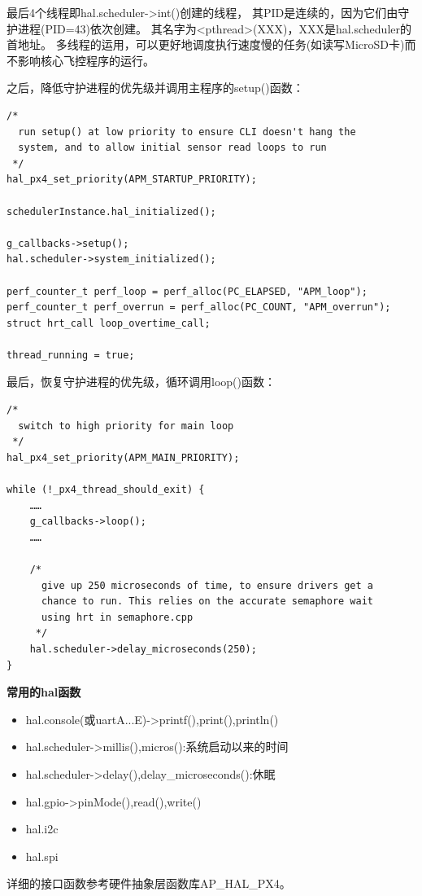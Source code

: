 \documentclass[a4paper,10pt]{ctexart} %
\begin{document}
\noindent 最后4个线程即hal.scheduler->int()创建的线程，
其PID是连续的，因为它们由守护进程(PID=43)依次创建。
其名字为<pthread>(XXX)，XXX是hal.scheduler的首地址。
多线程的运用，可以更好地调度执行速度慢的任务(如读写MicroSD卡)而不影响核心飞控程序的运行。

\noindent 之后，降低守护进程的优先级并调用主程序的setup()函数：
\begin{lstlisting}
/*
  run setup() at low priority to ensure CLI doesn't hang the
  system, and to allow initial sensor read loops to run
 */
hal_px4_set_priority(APM_STARTUP_PRIORITY);

schedulerInstance.hal_initialized();

g_callbacks->setup();
hal.scheduler->system_initialized();

perf_counter_t perf_loop = perf_alloc(PC_ELAPSED, "APM_loop");
perf_counter_t perf_overrun = perf_alloc(PC_COUNT, "APM_overrun");
struct hrt_call loop_overtime_call;

thread_running = true;
\end{lstlisting}
最后，恢复守护进程的优先级，循环调用loop()函数：
\begin{lstlisting}
/*
  switch to high priority for main loop
 */
hal_px4_set_priority(APM_MAIN_PRIORITY);

while (!_px4_thread_should_exit) {
	……
    g_callbacks->loop();
	……
	
    /*
      give up 250 microseconds of time, to ensure drivers get a
      chance to run. This relies on the accurate semaphore wait
      using hrt in semaphore.cpp
     */
    hal.scheduler->delay_microseconds(250);
}
\end{lstlisting}

\vspace{20pt}
\noindent \textbf{常用的hal函数}\\
\begin{itemize}
\item hal.console(或uartA...E)->printf(),print(),println()
\item hal.scheduler->millis(),micros():系统启动以来的时间
\item hal.scheduler->delay(),delay\_microseconds():休眠
\item hal.gpio->pinMode(),read(),write()
\item hal.i2c
\item hal.spi
\end{itemize}
详细的接口函数参考硬件抽象层函数库AP\_HAL\_PX4。
\end{document}
